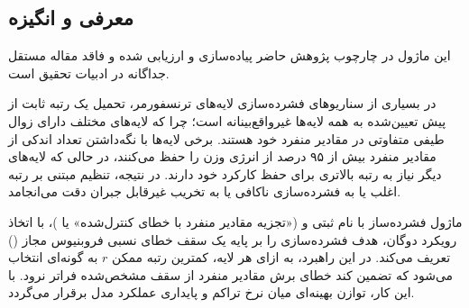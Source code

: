 \subsection{معرفی و انگیزه}
این ماژول در چارچوب پژوهش حاضر پیاده‌سازی و ارزیابی شده و فاقد مقاله مستقل جداگانه در ادبیات تحقیق است.

در بسیاری از سناریوهای فشرده‌سازی لایه‌های ترنسفورمر، تحمیل یک رتبه ثابت از پیش تعیین‌شده به همه لایه‌ها غیرواقع‌بینانه است؛ چرا که لایه‌های مختلف دارای زوال طیفی متفاوتی در مقادیر منفرد خود هستند. برخی لایه‌ها با نگه‌داشتن تعداد اندکی از مقادیر منفرد بیش از ۹۵ درصد از انرژی وزن را حفظ می‌کنند، در حالی که لایه‌های دیگر نیاز به رتبه بالاتری برای حفظ کارکرد خود دارند. در نتیجه، تنظیم مبتنی بر رتبه اغلب یا به فشرده‌سازی ناکافی یا به تخریب غیرقابل جبران دقت می‌انجامد.

ماژول فشرده‌ساز  با نام ثبتی  و  («تجزیه مقادیر منفرد با خطای کنترل‌شده» یا )، با اتخاذ رویکرد دوگان، هدف فشرده‌سازی را بر پایه یک سقف خطای نسبی فروبنیوس مجاز () تعریف می‌کند. در این راهبرد، به ازای هر لایه، کمترین رتبه ممکن $r$ به گونه‌ای انتخاب می‌شود که تضمین کند خطای برش مقادیر منفرد از سقف مشخص‌شده فراتر نرود. با این کار، توازن بهینه‌ای میان نرخ تراکم و پایداری عملکرد مدل برقرار می‌گردد.
